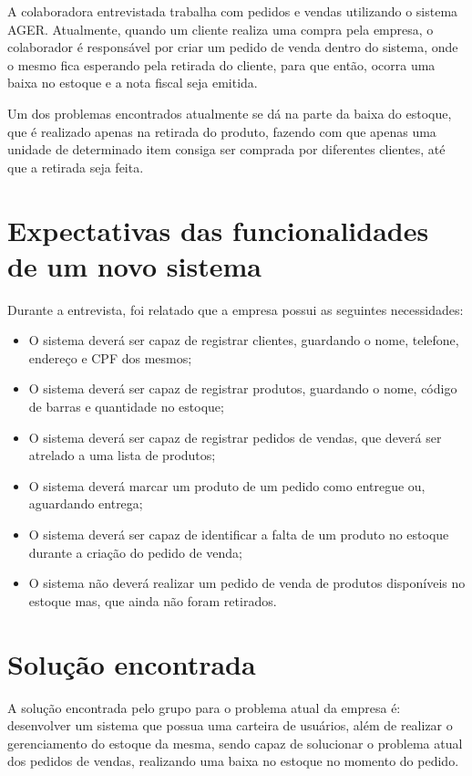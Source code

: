 \documentclass[serif, english, brazilian, oneside]{uffstex}
\begin{document}
A colaboradora entrevistada trabalha com pedidos e vendas utilizando o sistema AGER. Atualmente, quando um cliente realiza uma compra pela empresa, o colaborador é responsável por criar um pedido de venda dentro do sistema, onde o mesmo fica esperando pela retirada do cliente, para que então, ocorra uma baixa no estoque e a nota fiscal seja emitida.

Um dos problemas encontrados atualmente se dá na parte da baixa do estoque, que é realizado apenas na retirada do produto, fazendo com que apenas uma unidade de determinado item consiga ser comprada por diferentes clientes, até que a retirada seja feita.

\section{Expectativas das funcionalidades de um novo sistema}

Durante a entrevista, foi relatado que a empresa possui as seguintes necessidades:

\begin{itemize}
    \item O sistema deverá ser capaz de registrar clientes, guardando o nome, telefone, endereço e CPF dos mesmos;
    \item O sistema deverá ser capaz de registrar produtos, guardando o nome, código de barras e quantidade no estoque;
    \item O sistema deverá ser capaz de registrar pedidos de vendas, que deverá ser atrelado a uma lista de produtos;
    \item O sistema deverá marcar um produto de um pedido como entregue ou, aguardando entrega;
    \item O sistema deverá ser capaz de identificar a falta de um produto no estoque durante a criação do pedido de venda;
    \item O sistema não deverá realizar um pedido de venda de produtos disponíveis no estoque mas, que ainda não foram retirados.
\end{itemize}

\section{Solução encontrada}

A solução encontrada pelo grupo para o problema atual da empresa é: desenvolver um sistema que possua uma carteira de usuários, além de realizar o gerenciamento do estoque da mesma, sendo capaz de solucionar o problema atual dos pedidos de vendas, realizando uma baixa no estoque no momento do pedido.
\end{document}
